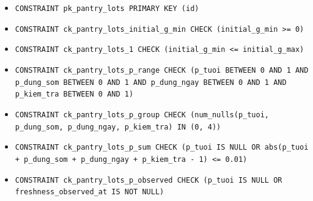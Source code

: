 \begin{itemize}
\item \raggedright {\small\texttt{CONSTRAINT pk\_\allowbreak{}\allowbreak{}pantry\_\allowbreak{}\allowbreak{}lots PRIMARY KEY (id)}}
\item \raggedright {\small\texttt{CONSTRAINT ck\_\allowbreak{}\allowbreak{}pantry\_\allowbreak{}\allowbreak{}lots\_\allowbreak{}\allowbreak{}initial\_\allowbreak{}\allowbreak{}g\_\allowbreak{}\allowbreak{}min CHECK (initial\_\allowbreak{}\allowbreak{}g\_\allowbreak{}\allowbreak{}min >= 0)}}
\item \raggedright {\small\texttt{CONSTRAINT ck\_\allowbreak{}\allowbreak{}pantry\_\allowbreak{}\allowbreak{}lots\_\allowbreak{}\allowbreak{}1 CHECK (initial\_\allowbreak{}\allowbreak{}g\_\allowbreak{}\allowbreak{}min <= initial\_\allowbreak{}\allowbreak{}g\_\allowbreak{}\allowbreak{}max)}}
\item \raggedright {\small\texttt{CONSTRAINT ck\_\allowbreak{}\allowbreak{}pantry\_\allowbreak{}\allowbreak{}lots\_\allowbreak{}\allowbreak{}p\_\allowbreak{}\allowbreak{}range CHECK (p\_\allowbreak{}\allowbreak{}tuoi BETWEEN 0 AND 1 AND p\_\allowbreak{}\allowbreak{}dung\_\allowbreak{}\allowbreak{}som BETWEEN 0 AND 1 AND p\_\allowbreak{}\allowbreak{}dung\_\allowbreak{}\allowbreak{}ngay BETWEEN 0 AND 1 AND p\_\allowbreak{}\allowbreak{}kiem\_\allowbreak{}\allowbreak{}tra BETWEEN 0 AND 1)}}
\item \raggedright {\small\texttt{CONSTRAINT ck\_\allowbreak{}\allowbreak{}pantry\_\allowbreak{}\allowbreak{}lots\_\allowbreak{}\allowbreak{}p\_\allowbreak{}\allowbreak{}group CHECK (num\_\allowbreak{}\allowbreak{}nulls(p\_\allowbreak{}\allowbreak{}tuoi, p\_\allowbreak{}\allowbreak{}dung\_\allowbreak{}\allowbreak{}som, p\_\allowbreak{}\allowbreak{}dung\_\allowbreak{}\allowbreak{}ngay, p\_\allowbreak{}\allowbreak{}kiem\_\allowbreak{}\allowbreak{}tra) IN (0, 4))}}
\item \raggedright {\small\texttt{CONSTRAINT ck\_\allowbreak{}\allowbreak{}pantry\_\allowbreak{}\allowbreak{}lots\_\allowbreak{}\allowbreak{}p\_\allowbreak{}\allowbreak{}sum CHECK (p\_\allowbreak{}\allowbreak{}tuoi IS NULL OR abs(p\_\allowbreak{}\allowbreak{}tuoi + p\_\allowbreak{}\allowbreak{}dung\_\allowbreak{}\allowbreak{}som + p\_\allowbreak{}\allowbreak{}dung\_\allowbreak{}\allowbreak{}ngay + p\_\allowbreak{}\allowbreak{}kiem\_\allowbreak{}\allowbreak{}tra -\allowbreak{} 1) <= 0.\allowbreak{}01)}}
\item \raggedright {\small\texttt{CONSTRAINT ck\_\allowbreak{}\allowbreak{}pantry\_\allowbreak{}\allowbreak{}lots\_\allowbreak{}\allowbreak{}p\_\allowbreak{}\allowbreak{}observed CHECK (p\_\allowbreak{}\allowbreak{}tuoi IS NULL OR freshness\_\allowbreak{}\allowbreak{}observed\_\allowbreak{}\allowbreak{}at IS NOT NULL)}}

\end{itemize}
